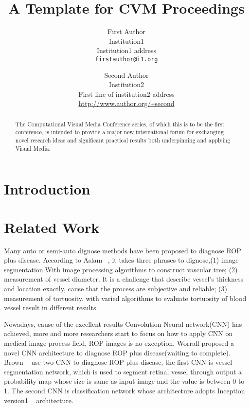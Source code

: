 \documentclass[10pt,twocolumn,letterpaper]{article}
\begin{document}
\title{A Template for CVM Proceedings}

\author{First Author\\
Institution1\\
Institution1 address\\
{\tt\small firstauthor@i1.org}
\and
Second Author\\
Institution2\\
First line of institution2 address\\
{\small\url{http://www.author.org/~second}}
}

\maketitle

\begin{abstract}
    The Computational Visual Media Conference series, of which this is to be the first conference, is intended to provide a major new international forum for exchanging novel research ideas and significant practical results both underpinning and applying Visual Media.
\end{abstract}

\section{Introduction}


\section{Related Work}
  Many auto or semi-auto dignose methods have been proposed to diagnose ROP plus disease. According to Aslam \etal~\cite{},  it takes three phrases to dignose,(1) image segmentation.With image processing algorithms to construct vascular tree; (2) measurement of vessel diameter. It is a challenge that describe vessel's thickness and location exactly, cause that the process are subjective and reliable; (3) measurement of tortuosity. with varied algorithms to evaluate tortuosity of blood vessel result in different results.

  Nowadays, cause of the excellent results Convolution Neural network(CNN) has achieved, more and more researchers start to focus on how to apply CNN on medical image process field, ROP images is no exception. Worrall \etal proposed a novel CNN architecture to diagnose ROP plus disease(waiting to complete). Brown \etal ~\cite{} use two CNN to diagnose ROP plus disease, the first CNN is vessel segmentation network, which is used to segment retinal vessel through output a probability map whose size is same as input image and the value is between 0 to 1. The second CNN is classification network whose architecture adopts Inception version1 ~\cite{} architecture.
\end{document}
